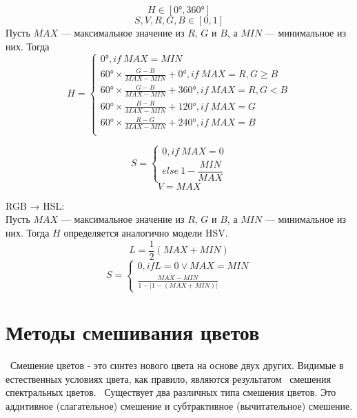 \begin{equation}
 H \in [0°, 360°] 
 \end{equation}
 \begin{equation}
 S,V,R,G,B \in [0,1]
\end{equation}
Пусть $MAX$ — максимальное значение из $R$, $G$ и $B$, а $MIN$ — минимальное из них. Тогда
\begin{equation}
H={\begin{cases} 0°,        if ~ MAX=MIN \\
	60°\times {\frac  {G-B}{MAX-MIN}}+0°, if~MAX=R, G\geq B \\
	60°\times {\frac  {G-B}{MAX-MIN}}+360°, if~MAX=R, G < B \\
	60°\times {\frac  {B-R}{MAX-MIN}}+120°, if~MAX=G \\
	60°\times {\frac  {R-G}{MAX-MIN}}+240°, if~ MAX= B \\
	\end{cases}}
\end{equation}

 \begin{equation}
S={\begin{cases} 0, if~{\displaystyle MAX=0} \\
else~{\displaystyle 1-{\dfrac {MIN}{MAX}}}  
	\end{cases}}	
\end{equation}
 \begin{equation}
V=MAX
\end{equation}

RGB → HSL:\\
Пусть $MAX$ — максимальное значение из $R$, $G$ и $B$, а $MIN$ — минимальное из них. Тогда $H$ определяется аналогично модели HSV.
 \begin{equation}
L=\frac{1}{2}(MAX+MIN)
\end{equation}
 \begin{equation}
S={\begin{cases} 0, if  L = 0 \vee MAX = MIN \\
	 \frac{MAX-MIN}{1-|1-(MAX+MIN)|}
	\end{cases}}
\end{equation}

\section{Методы смешивания цветов}
 Смешение цветов - это синтез нового цвета на основе двух других.  Видимые в естественных условиях цвета, как правило, являются результатом
 смешения спектральных цветов.
 Существует два различных типа смешения цветов. Это аддитивное (слагательное) смешение и субтрактивное (вычитательное) смешение.
 
